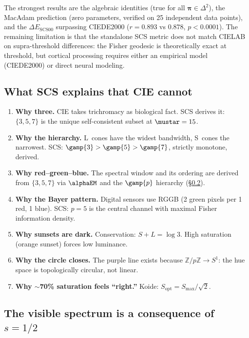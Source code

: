 \documentclass[12pt,a4paper]{article}
\begin{document}
The strongest results are the algebraic identities (true for all
$\bm{\pi} \in \Delta^2$), the MacAdam prediction (zero parameters,
verified on 25 independent data points), and the
$\Delta E_{\mathrm{SCS00}}$ surpassing CIEDE2000 ($r = 0.893$ vs
$0.878$, $p < 0.0001$). The remaining limitation is that the
standalone SCS metric does not match CIELAB on supra-threshold
differences: the Fisher geodesic is theoretically exact at threshold,
but cortical processing requires either an empirical model (CIEDE2000)
or direct neural modeling.

\subsection{What SCS explains that CIE cannot}

\begin{enumerate}[nosep]
\item \textbf{Why three.} CIE takes trichromacy as biological fact.
  SCS derives it: $\{3,5,7\}$ is the unique self-consistent subset
  at $\mustar = 15$.
\item \textbf{Why the hierarchy.} L~cones have the widest bandwidth,
  S~cones the narrowest. SCS: $\gamp{3} > \gamp{5} > \gamp{7}$,
  strictly monotone, derived.
\item \textbf{Why red--green--blue.} The spectral window and its
  ordering are derived from $\{3,5,7\}$ via $\alphaEM$ and the
  $\gamp{p}$ hierarchy (\S\ref{sec:visible}).
\item \textbf{Why the Bayer pattern.} Digital sensors use RGGB (2 green
  pixels per 1 red, 1 blue). SCS: $p=5$ is the central channel with
  maximal Fisher information density.
\item \textbf{Why sunsets are dark.} Conservation: $S + L = \log 3$.
  High saturation (orange sunset) forces low luminance.
\item \textbf{Why the circle closes.} The purple line exists because
  $\mathbb{Z}/p\mathbb{Z} \to S^1$: the hue space is topologically
  circular, not linear.
\item \textbf{Why $\sim$70\% saturation feels ``right.''} Koide:
  $S_{\text{opt}} = S_{\max}/\sqrt{2}$.
\end{enumerate}

\subsection{The visible spectrum is a consequence of $s = 1/2$}
\label{sec:visible}
\end{document}

